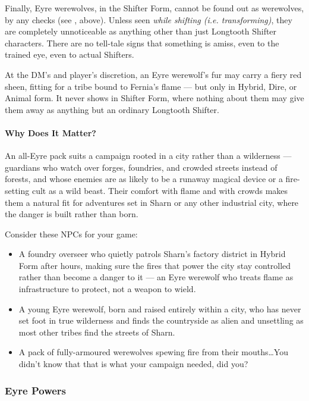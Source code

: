 \documentclass[twocolumn]{dndbook}
\begin{document}
Finally, Eyre werewolves, in the Shifter Form, cannot be found out as werewolves, by any checks (see , above).
Unless seen \emph{while shifting (i.e. transforming)}, they are completely unnoticeable as anything other than just Longtooth Shifter characters.
There are no tell-tale signs that something is amiss, even to the trained eye, even to actual Shifters.\par

At the DM's and player's discretion, an Eyre werewolf's fur may carry a fiery red sheen, fitting for a tribe bound to Fernia's flame --- but only in Hybrid, Dire, or Animal form.
It never shows in Shifter Form, where nothing about them may give them away as anything but an ordinary Longtooth Shifter.

\paragraph*{Why Does It Matter?} An all-Eyre pack suits a campaign rooted in a city rather than a wilderness --- guardians who watch over forges, foundries, and crowded streets instead of forests, and whose enemies are as likely to be a runaway magical device or a fire-setting cult as a wild beast.
Their comfort with flame and with crowds makes them a natural fit for adventures set in Sharn or any other industrial city, where the danger is built rather than born.

Consider these NPCs for your game:
\begin{itemize}
    \item A foundry overseer who quietly patrols Sharn's factory district in Hybrid Form after hours, making sure the fires that power the city stay controlled rather than become a danger to it --- an Eyre werewolf who treats flame as infrastructure to protect, not a weapon to wield.
    \item A young Eyre werewolf, born and raised entirely within a city, who has never set foot in true wilderness and finds the countryside as alien and unsettling as most other tribes find the streets of Sharn.
    \item A pack of fully-armoured werewolves spewing fire from their mouths\ldots You didn't know that that is what your campaign needed, did you?
\end{itemize}


\subsubsection{Eyre Powers}
\end{document}
